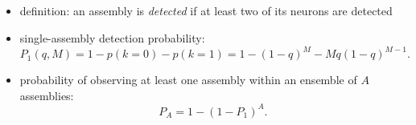 \documentclass[8pt,t,usepdftitle=false]{beamer}
\begin{document}
\subsection{\ttl}
\begin{frame}[plain]
  \frametitle{\ttl}
  \vspace*{-1ex}
  \begin{itemize}
  \item definition: an assembly is \emph{detected} if at least two of its neurons are detected
  \item single-assembly detection probability:
    \begin{equation*}
      P_1(q,M) = 1 - p(k=0) - p(k=1) = 1 - (1-q)^M - M q (1-q)^{M-1}.
    \end{equation*}
  \item probability of observing at least one assembly within an ensemble of $A$ assemblies:
    \begin{equation*}
      P_A = 1 - (1-P_1)^A.
    \end{equation*}
  \end{itemize}
\end{frame}
\end{document}
